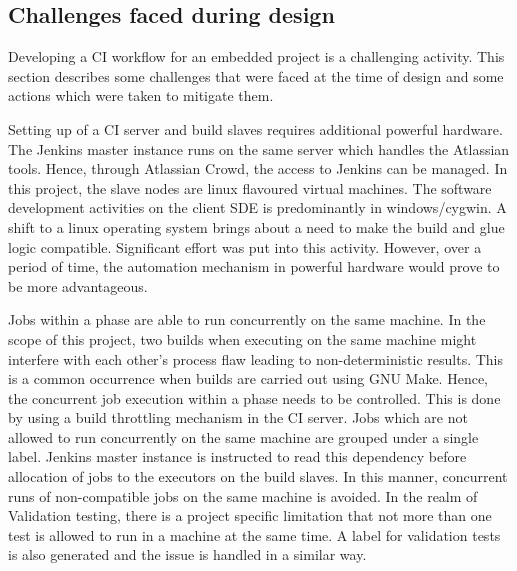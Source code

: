 \documentclass[12pt, a4paper, titlepage]{scrartcl}
\begin{document}
\subsection{Challenges faced during design}
\par Developing a CI workflow for an embedded project is a challenging activity. This section describes some challenges that were faced at the time of design and some actions which were taken to mitigate them. 
\par Setting up of a CI server and build slaves requires additional powerful hardware. The Jenkins master instance runs on the same server which handles the Atlassian tools. Hence, through Atlassian Crowd, the access to Jenkins can be managed. In this project, the slave nodes are linux flavoured virtual machines. The software development activities on the client SDE is predominantly in windows/cygwin. A shift to a linux operating system brings about a need to make the build and glue logic compatible. Significant effort was put into this activity. However, over a period of time, the automation mechanism in powerful hardware would prove to be more advantageous\cite{miller2008hundred}. 
\par Jobs within a phase are able to run concurrently on the same machine. In the scope of this project, two builds when executing on the same machine might interfere with each other's process flaw leading to non-deterministic results. This is a common occurrence when builds are carried out using GNU Make. Hence, the concurrent job execution within a phase needs to be controlled. This is done by using a build throttling mechanism in the CI server. Jobs which are not allowed to run concurrently on the same machine are grouped under a single label. Jenkins master instance is instructed to read this dependency before allocation of jobs to the executors on the build slaves. In this manner, concurrent runs of non-compatible jobs on the same machine is avoided. In the realm of Validation testing, there is a project specific limitation that not more than one test is allowed to run in a machine at the same time. A label for validation tests is also generated and the issue is handled in a similar way. 
\end{document}
